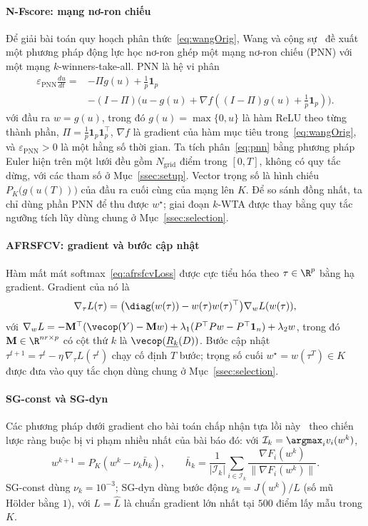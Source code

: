 \paragraph*{N-Fscore: mạng nơ-ron chiếu}
Để giải bài toán quy hoạch phân thức~\eqref{eq:wangOrig}, Wang và cộng sự~\citep{wang2021fractional} đề xuất một phương pháp động lực học nơ-ron ghép một mạng nơ-ron chiếu (PNN) với một mạng $k$-winners-take-all. PNN là hệ vi phân
\begin{equation}\label{eq:pnn}
\begin{split}\varepsilon_{\mathrm{PNN}}\frac{du}{dt}={}&-\Pi g(u)+\tfrac1p\mathbf{1}_p\\&-(I-\Pi)\bigl(u-g(u)+\nabla f((I-\Pi)g(u)+\tfrac1p\mathbf{1}_p)\bigr).\end{split}
\end{equation}
với đầu ra $w=g(u)$, trong đó $g(u)=\max\{0,u\}$ là hàm ReLU theo từng thành phần, $\Pi=\tfrac1p\mathbf{1}_p\mathbf{1}_p^{\top}$, $\nabla f$ là gradient của hàm mục tiêu trong~\eqref{eq:wangOrig}, và $\varepsilon_{\mathrm{PNN}}>0$ là một hằng số thời gian. Ta tích phân~\eqref{eq:pnn} bằng phương pháp Euler hiện trên một lưới đều gồm $N_{\mathrm{grid}}$ điểm trong $[0,T]$, không có quy tắc dừng, với các tham số ở Mục~\ref{ssec:setup}. Vector trọng số là hình chiếu $P_K\bigl(g(u(T))\bigr)$ của đầu ra cuối cùng của mạng lên $K$. Để so sánh đồng nhất, ta chỉ dùng phần PNN để thu được $w^\star$; giai đoạn $k$-WTA được thay bằng quy tắc ngưỡng tích lũy dùng chung ở Mục~\ref{ssec:selection}.

\paragraph*{AFRSFCV: gradient và bước cập nhật}
Hàm mất mát softmax~\eqref{eq:afrsfcvLoss} được cực tiểu hóa theo $\tau\in\R^p$ bằng hạ gradient. Gradient của nó là
\begin{equation}\label{eq:gradTau}
\nabla_\tau L(\tau)=\bigl(\diag(w(\tau))-w(\tau)w(\tau)^{\top}\bigr)\nabla_w L(w(\tau)),
\end{equation}
với $\nabla_w L=-\mathbf{M}^{\top}(\vecop(Y)-\mathbf{M}w)+\lambda_1(P^{\top}Pw-P^{\top}\mathbf{1}_n)+\lambda_2 w$, trong đó $\mathbf{M}\in\R^{nr\times p}$ có cột thứ $k$ là $\vecop(\underline{R_k}(D))$. Bước cập nhật $\tau^{t+1}=\tau^t-\eta\,\nabla_\tau L(\tau^t)$ chạy cố định $T$ bước; trọng số cuối $w^\star=w(\tau^T)\in K$ được đưa vào quy tắc chọn dùng chung ở Mục~\ref{ssec:selection}.

\paragraph*{SG-const và SG-dyn}
Các phương pháp dưới gradient cho bài toán chấp nhận tựa lồi này~\citep{hu2022quasi} theo
chiến lược ràng buộc bị vi phạm nhiều nhất của bài báo đó: với $\mathcal I_k=\argmax_i v_i(w^k)$,
\[
w^{k+1}=P_K(w^k-\nu_k\bar h_k),\qquad
\bar h_k=\frac1{|\mathcal I_k|}\sum_{i\in\mathcal I_k}\frac{\nabla F_i(w^k)}{\|\nabla F_i(w^k)\|}.
\]
SG-const dùng $\nu_k=10^{-3}$; SG-dyn dùng bước động $\nu_k=J(w^k)/L$ (số mũ H\"older
bằng $1$), với $L=\widehat L$ là chuẩn gradient lớn nhất tại $500$ điểm lấy mẫu trong $K$.



